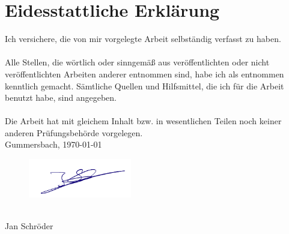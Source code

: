 \chapter*{Eidesstattliche Erklärung}

Ich versichere, die von mir vorgelegte Arbeit selbständig verfasst zu haben.\\ \\
Alle Stellen, die wörtlich oder sinngemäß aus veröffentlichten oder nicht veröffentlichten Arbeiten anderer entnommen sind, habe ich als entnommen kenntlich gemacht. Sämtliche Quellen und Hilfsmittel, die ich für die Arbeit benutzt habe, sind angegeben.\\ \\
Die Arbeit hat mit gleichem Inhalt bzw. in wesentlichen Teilen noch keiner anderen Prüfungsbehörde vorgelegen.
\vspace{1.5cm}
\\
Gummersbach, \today
\vspace{0.2cm}
\begin{figure}[H]
	\hspace{-1cm}
		\includegraphics[width=0.4\textwidth]{images/unterschrift.png}
\end{figure}
\\
\hspace{-0.4cm}Jan Schröder


